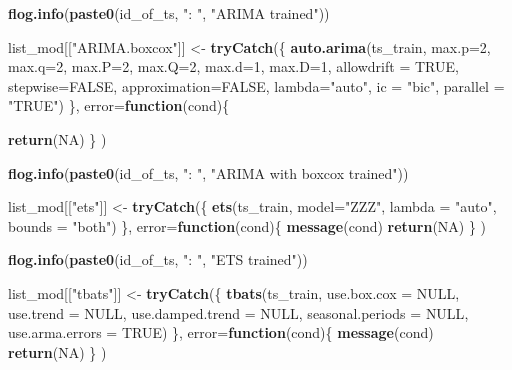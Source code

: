 \documentclass[
]{article}
\newenvironment{Shaded}{\begin{snugshade}}{\end{snugshade}}
\newcommand{\AttributeTok}[1]{\textcolor[rgb]{0.13,0.29,0.53}{#1}}
\newcommand{\ConstantTok}[1]{\textcolor[rgb]{0.56,0.35,0.01}{#1}}
\newcommand{\ControlFlowTok}[1]{\textcolor[rgb]{0.13,0.29,0.53}{\textbf{#1}}}
\newcommand{\DecValTok}[1]{\textcolor[rgb]{0.00,0.00,0.81}{#1}}
\newcommand{\FunctionTok}[1]{\textcolor[rgb]{0.13,0.29,0.53}{\textbf{#1}}}
\newcommand{\NormalTok}[1]{#1}
\newcommand{\OtherTok}[1]{\textcolor[rgb]{0.56,0.35,0.01}{#1}}
\newcommand{\StringTok}[1]{\textcolor[rgb]{0.31,0.60,0.02}{#1}}
\begin{document}
\begin{Shaded}
\begin{Highlighting}[]
    \FunctionTok{flog.info}\NormalTok{(}\FunctionTok{paste0}\NormalTok{(id\_of\_ts, }\StringTok{": "}\NormalTok{, }\StringTok{"ARIMA trained"}\NormalTok{))}
  
\NormalTok{    list\_mod[[}\StringTok{"ARIMA.boxcox"}\NormalTok{]] }\OtherTok{\textless{}{-}} \FunctionTok{tryCatch}\NormalTok{(\{}
      \FunctionTok{auto.arima}\NormalTok{(ts\_train, }\AttributeTok{max.p=}\DecValTok{2}\NormalTok{, }\AttributeTok{max.q=}\DecValTok{2}\NormalTok{,}
                 \AttributeTok{max.P=}\DecValTok{2}\NormalTok{, }\AttributeTok{max.Q=}\DecValTok{2}\NormalTok{, }\AttributeTok{max.d=}\DecValTok{1}\NormalTok{, }\AttributeTok{max.D=}\DecValTok{1}\NormalTok{, }\AttributeTok{allowdrift =} \ConstantTok{TRUE}\NormalTok{,}
                 \AttributeTok{stepwise=}\ConstantTok{FALSE}\NormalTok{, }\AttributeTok{approximation=}\ConstantTok{FALSE}\NormalTok{, }\AttributeTok{lambda=}\StringTok{"auto"}\NormalTok{,}
                 \AttributeTok{ic =} \StringTok{"bic"}\NormalTok{, }\AttributeTok{parallel =} \StringTok{"TRUE"}\NormalTok{)}
\NormalTok{    \},}
    \AttributeTok{error=}\ControlFlowTok{function}\NormalTok{(cond)\{}
  
      \FunctionTok{return}\NormalTok{(}\ConstantTok{NA}\NormalTok{)}
\NormalTok{    \}}
\NormalTok{    )}
  
    \FunctionTok{flog.info}\NormalTok{(}\FunctionTok{paste0}\NormalTok{(id\_of\_ts, }\StringTok{": "}\NormalTok{, }\StringTok{"ARIMA with boxcox trained"}\NormalTok{))}
  
\NormalTok{    list\_mod[[}\StringTok{"ets"}\NormalTok{]] }\OtherTok{\textless{}{-}} \FunctionTok{tryCatch}\NormalTok{(\{}
      \FunctionTok{ets}\NormalTok{(ts\_train, }\AttributeTok{model=}\StringTok{"ZZZ"}\NormalTok{, }\AttributeTok{lambda =} \StringTok{"auto"}\NormalTok{, }\AttributeTok{bounds =} \StringTok{"both"}\NormalTok{)}
\NormalTok{    \},}
    \AttributeTok{error=}\ControlFlowTok{function}\NormalTok{(cond)\{}
      \FunctionTok{message}\NormalTok{(cond)}
      \FunctionTok{return}\NormalTok{(}\ConstantTok{NA}\NormalTok{)}
\NormalTok{    \}}
\NormalTok{    )}
  
    \FunctionTok{flog.info}\NormalTok{(}\FunctionTok{paste0}\NormalTok{(id\_of\_ts, }\StringTok{": "}\NormalTok{, }\StringTok{"ETS trained"}\NormalTok{))}
  
\NormalTok{    list\_mod[[}\StringTok{"tbats"}\NormalTok{]] }\OtherTok{\textless{}{-}} \FunctionTok{tryCatch}\NormalTok{(\{}
      \FunctionTok{tbats}\NormalTok{(ts\_train, }\AttributeTok{use.box.cox =} \ConstantTok{NULL}\NormalTok{, }\AttributeTok{use.trend =} \ConstantTok{NULL}\NormalTok{, }\AttributeTok{use.damped.trend =} \ConstantTok{NULL}\NormalTok{,}
            \AttributeTok{seasonal.periods =} \ConstantTok{NULL}\NormalTok{, }\AttributeTok{use.arma.errors =} \ConstantTok{TRUE}\NormalTok{)}
\NormalTok{    \},}
    \AttributeTok{error=}\ControlFlowTok{function}\NormalTok{(cond)\{}
      \FunctionTok{message}\NormalTok{(cond)}
      \FunctionTok{return}\NormalTok{(}\ConstantTok{NA}\NormalTok{)}
\NormalTok{    \}}
\NormalTok{    )}
  

\end{Highlighting}
\end{Shaded}
\end{document}

